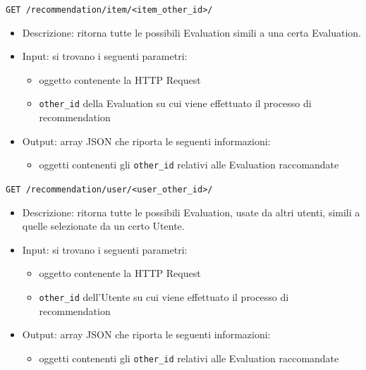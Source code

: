 \begin{description}
    \item[Richiesta al Item Recommendation Algorithm]
    \item\texttt{GET /recommendation/item/<item\_other\_id>/}
    \begin{itemize}
        \item Descrizione: ritorna tutte le possibili Evaluation simili a una certa Evaluation.
        \item Input: si trovano i seguenti parametri:
        \begin{itemize}
            \item oggetto contenente la HTTP Request
            \item \texttt{other\_id} della Evaluation su cui viene effettuato il processo di recommendation
        \end{itemize}
        \item Output: array JSON che riporta le seguenti informazioni:
        \begin{itemize}
            \item oggetti contenenti gli \texttt{other\_id} relativi alle Evaluation raccomandate
        \end{itemize}
    \end{itemize}
 
    \item[Richiesta al User Recommendation Algorithm]
    \item\texttt{GET /recommendation/user/<user\_other\_id>/}
    \begin{itemize}
        \item Descrizione: ritorna tutte le possibili Evaluation, usate da altri utenti, simili a quelle selezionate da un certo Utente.
        \item Input: si trovano i seguenti parametri:
        \begin{itemize}
            \item oggetto contenente la HTTP Request
            \item \texttt{other\_id} dell'Utente su cui viene effettuato il processo di recommendation
        \end{itemize}
        \item Output: array JSON che riporta le seguenti informazioni:
        \begin{itemize}
            \item oggetti contenenti gli \texttt{other\_id} relativi alle Evaluation raccomandate
        \end{itemize}
    \end{itemize}
 

\end{description}
